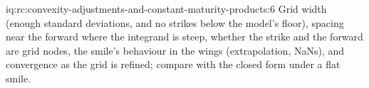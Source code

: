 \begin{solution}{iq:rc:convexity-adjustments-and-constant-maturity-products:6}
Grid width (enough standard deviations, and no strikes below the model's floor),
spacing near the forward where the integrand is steep, whether the strike and
the forward are grid nodes, the smile's behaviour in the wings (extrapolation,
NaNs), and convergence as the grid is refined; compare with the closed form
under a flat smile.
\end{solution}
